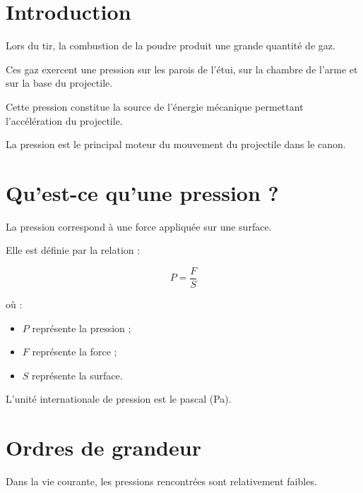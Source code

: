 
\section{Introduction}

Lors du tir, la combustion de la poudre produit une grande quantité de gaz.

Ces gaz exercent une pression sur les parois de l'étui, sur la chambre de
l'arme et sur la base du projectile.

Cette pression constitue la source de l'énergie mécanique permettant
l'accélération du projectile.

\begin{aretenir}

La pression est le principal moteur du mouvement du projectile dans le canon.

\end{aretenir}

\section{Qu'est-ce qu'une pression ?}

La pression correspond à une force appliquée sur une surface.

Elle est définie par la relation :

\begin{equation}
P=\frac{F}{S}
\end{equation}

où :

\begin{itemize}
    \item $P$ représente la pression ;
    \item $F$ représente la force ;
    \item $S$ représente la surface.
\end{itemize}

L'unité internationale de pression est le pascal (Pa).

\section{Ordres de grandeur}

Dans la vie courante, les pressions rencontrées sont relativement faibles.


